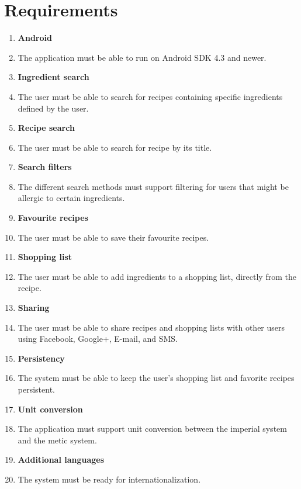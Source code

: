 \section{Requirements}
\begin{enumerate}
  \item\label{req:android} \textbf{Android} 
    \item [] The application must be able to run on Android SDK 4.3 and newer.
    
  \item\label{req:ingredientsearch} \textbf{Ingredient search} 
    \item [] The user must be able to search for recipes containing specific ingredients defined by the user.
    
  \item\label{req:recipesearch} \textbf{Recipe search} 
    \item [] The user must be able to search for recipe by its title.
    
  \item\label{req:searchfilters} \textbf{Search filters} 
    \item [] The different search methods must support filtering for users that might be allergic to certain ingredients.
    
  \item\label{req:favourite} \textbf{Favourite recipes} 
    \item [] The user must be able to save their favourite recipes.
    
  \item\label{req:shoppinglist} \textbf{Shopping list} 
    \item [] The user must be able to add ingredients to a shopping list, directly from the recipe.
    
  \item\label{req:sharing} \textbf{Sharing} 
    \item [] The user must be able to share recipes and shopping lists with other users using Facebook, Google+, E-mail, and SMS.
    
  \item\label{req:persistency} \textbf{Persistency} 
    \item [] The system must be able to keep the user's shopping list and favorite recipes persistent.
    
  \item\label{req:unitconversion} \textbf{Unit conversion} 
    \item [] The application must support unit conversion between the imperial system and the metic system.
    
  \item\label{req:additionallanguages} \textbf{Additional languages} 
    \item [] The system must be ready for internationalization.
\end{enumerate}